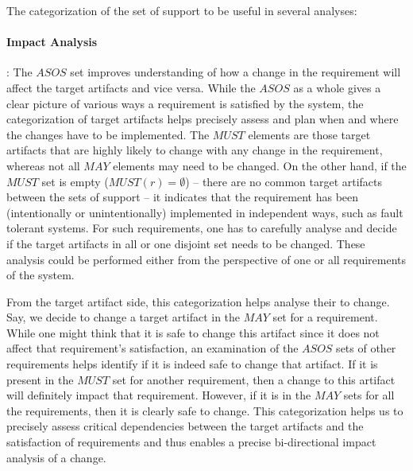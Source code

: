 The categorization of the set of support to be useful in several analyses:

\paragraph{Impact Analysis}: The $ASOS$ set improves understanding of how a change in the requirement will affect the target artifacts and vice versa. While the $ASOS$ as a whole gives a clear picture of various ways a requirement is satisfied by the system, the categorization of target artifacts helps precisely assess and plan when and where the changes have to be implemented. The $MUST$ elements are those target artifacts that are highly likely to change with any change in the requirement, whereas not all $MAY$ elements may need to be changed. On the other hand, if the $MUST$ set is empty ($MUST(r) = \emptyset$) -- there are no common target artifacts between the sets of support -- it indicates that the requirement has been (intentionally or unintentionally) implemented in independent ways, such as fault tolerant systems. For such requirements, one has to carefully analyse and decide if the target artifacts in all or one disjoint set needs to be changed. These analysis could be performed either from the perspective of one or all requirements of the system.

From the target artifact side, this categorization helps analyse their  to change. Say, we decide to change a target artifact in the $MAY$ set for a requirement. While one might think that it is safe to change this artifact since it does not affect that requirement's satisfaction, an examination of the $ASOS$ sets of other requirements helps identify if it is indeed safe to change that artifact. If it is present in the $MUST$ set for another requirement, then a change to this artifact will definitely impact that requirement. However, if it is in the $MAY$ sets for all the requirements, then it is clearly safe to change. This categorization helps us to precisely assess critical dependencies between the target artifacts and the satisfaction of requirements and thus enables a precise bi-directional impact analysis of a change.


